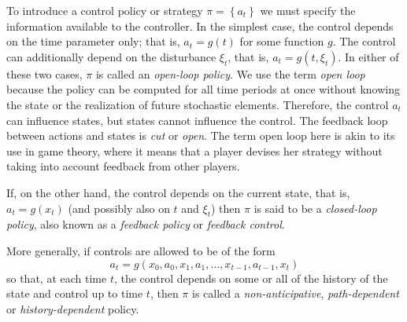 \documentclass[\topdir/lecture\_notes.tex]{subfiles}
\begin{document}
To introduce a control policy or strategy $\pi=\left\{a_{t}\right\}$ we must specify the information available to the controller. In the simplest case, the control depends on the time parameter only; that is, $a_{t}=g(t)$ for some function $g$. The control can additionally depend on the disturbance $\xi_t$, that is, $a_{t}=g(t,\xi_t)$. In either of these two cases, $\pi$ is called an \emph{open-loop policy}. We use the term \textit{open loop} because the policy can be computed for all time periods at once without knowing the state or the realization of future stochastic elements. Therefore, the control $a_{t}$ can influence states, but states cannot influence the control. The feedback loop between actions and states is \textit{cut} or \textit{open}. The term open loop here is akin to its use in game theory, where it means that a player devises her strategy without taking into account feedback from other players.
    
If, on the other hand, the control depends on the current state, that is, $a_{t}=g(x_{t})$ (and possibly also on $t$ and $\xi_t$) then $\pi$ is said to be a \emph{closed-loop policy}, also known as a \emph{feedback policy} or \emph{feedback control}.  
    
More generally, if controls are allowed to be of the form
\[
    a_{t}=g(x_{0}, a_{0}, x_{1}, a_{1}, \ldots, x_{t-1}, a_{t-1}, x_{t})
\]
so that, at each time $t$, the control depends on some or all of the history of the state and control up to time $t$, then $\pi$ is called a \emph{non-anticipative}, \emph{path-dependent} or \emph{history-dependent} policy.
\end{document}
